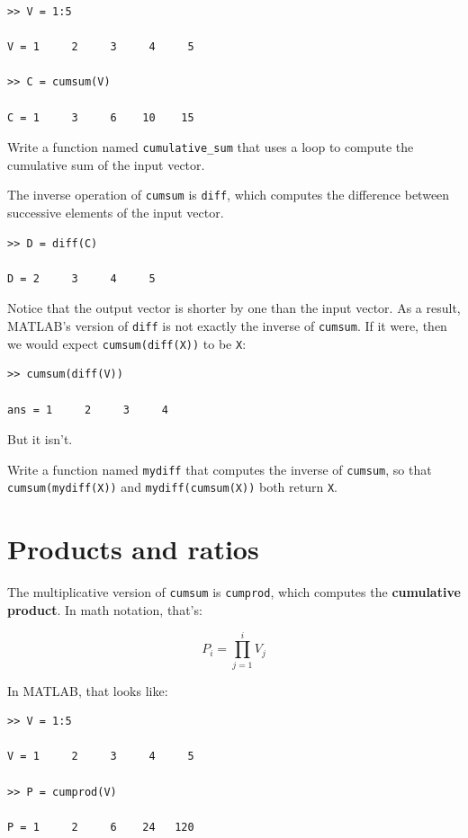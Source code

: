 \documentclass{book}
\begin{document}
\begin{verbatim}
>> V = 1:5

V = 1     2     3     4     5

>> C = cumsum(V)

C = 1     3     6    10    15
\end{verbatim}

\begin{ex}
Write a function named {\tt cumulative\_sum} that uses
a loop to compute the cumulative sum of the input vector.
\end{ex}

The inverse operation of {\tt cumsum} is {\tt diff}, which computes
the difference between successive elements of the input vector.

\begin{verbatim}
>> D = diff(C)

D = 2     3     4     5
\end{verbatim}

Notice that the output vector is shorter by one than the input
vector.  As a result, MATLAB's version of {\tt diff} is not
exactly the inverse of {\tt cumsum}.  If it were, then we would
expect {\tt cumsum(diff(X))} to be {\tt X}:

\begin{verbatim}
>> cumsum(diff(V))

ans = 1     2     3     4
\end{verbatim}

But it isn't.

\begin{ex}
Write a function named {\tt mydiff} that computes the
inverse of {\tt cumsum}, so that {\tt cumsum(mydiff(X))} and
{\tt mydiff(cumsum(X))} both
return {\tt X}.
\end{ex}


\section{Products and ratios}

The multiplicative version of {\tt cumsum} is {\tt cumprod},
which computes the {\bf cumulative product}.  In math notation,
that's:

\[ P_i = \prod_{j=1}^i V_j \]

In MATLAB, that looks like:

\begin{verbatim}
>> V = 1:5

V = 1     2     3     4     5

>> P = cumprod(V)

P = 1     2     6    24   120
\end{verbatim}
\end{document}

